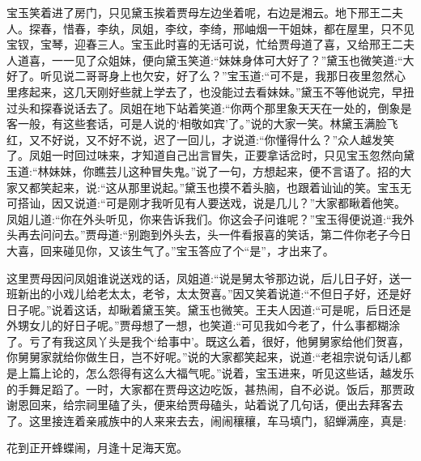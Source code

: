 \begin{parag}
    宝玉笑着进了房门，只见黛玉挨着贾母左边坐着呢，右边是湘云。地下邢王二夫人。探春，惜春，李纨，凤姐，李纹，李绮，邢岫烟一干姐妹，都在屋里，只不见宝钗，宝琴，迎春三人。宝玉此时喜的无话可说，忙给贾母道了喜，又给邢王二夫人道喜，一一见了众姐妹，便向黛玉笑道:“妹妹身体可大好了？”黛玉也微笑道:“大好了。听见说二哥哥身上也欠安，好了么？”宝玉道:“可不是，我那日夜里忽然心里疼起来，这几天刚好些就上学去了，也没能过去看妹妹。”黛玉不等他说完，早扭过头和探春说话去了。凤姐在地下站着笑道:“你两个那里象天天在一处的，倒象是客一般，有这些套话，可是人说的‘相敬如宾’了。”说的大家一笑。林黛玉满脸飞红，又不好说，又不好不说，迟了一回儿，才说道:“你懂得什么？”众人越发笑了。凤姐一时回过味来，才知道自己出言冒失，正要拿话岔时，只见宝玉忽然向黛玉道:“林妹妹，你瞧芸儿这种冒失鬼。”说了一句，方想起来，便不言语了。招的大家又都笑起来，说:“这从那里说起。”黛玉也摸不着头脑，也跟着讪讪的笑。宝玉无可搭讪，因又说道:“可是刚才我听见有人要送戏，说是几儿？”大家都瞅着他笑。凤姐儿道:“你在外头听见，你来告诉我们。你这会子问谁呢？”宝玉得便说道:“我外头再去问问去。”贾母道:“别跑到外头去，头一件看报喜的笑话，第二件你老子今日大喜，回来碰见你，又该生气了。”宝玉答应了个“是”，才出来了。
\end{parag}


\begin{parag}
    这里贾母因问凤姐谁说送戏的话，凤姐道:“说是舅太爷那边说，后儿日子好，送一班新出的小戏儿给老太太，老爷，太太贺喜。”因又笑着说道:“不但日子好，还是好日子呢。”说着这话，却瞅着黛玉笑。黛玉也微笑。王夫人因道:“可是呢，后日还是外甥女儿的好日子呢。”贾母想了一想，也笑道:“可见我如今老了，什么事都糊涂了。亏了有我这凤丫头是我个‘给事中’。既这么着，很好，他舅舅家给他们贺喜，你舅舅家就给你做生日，岂不好呢。”说的大家都笑起来，说道:“老祖宗说句话儿都是上篇上论的，怎么怨得有这么大福气呢。”说着，宝玉进来，听见这些话，越发乐的手舞足蹈了。一时，大家都在贾母这边吃饭，甚热闹，自不必说。饭后，那贾政谢恩回来，给宗祠里磕了头，便来给贾母磕头，站着说了几句话，便出去拜客去了。这里接连着亲戚族中的人来来去去，闹闹穰穰，车马填门，貂蝉满座，真是:
\end{parag}


\begin{poem}
    \begin{pl}
        花到正开蜂蝶闹，月逢十足海天宽。
    \end{pl}
\end{poem}



